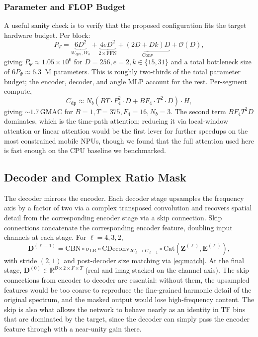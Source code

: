 \documentclass[journal,10pt]{IEEEtran}
\newcommand{\R}{\mathbb{R}}
\newcommand{\bE}{\mathbf{E}}
\newcommand{\bZ}{\mathbf{Z}}
\newcommand{\bD}{\mathbf{D}}
\begin{document}
\subsubsection{Parameter and FLOP Budget}
A useful sanity check is to verify that the proposed configuration fits the target hardware budget. Per block:
\begin{equation}
P_{\Psi}=\underbrace{6D^2}_{W_{\mathrm{qkv}},W_o}+\underbrace{4eD^2}_{2\times\mathrm{FFN}}+\underbrace{(2D+Dk)D}_{\mathrm{Conv}}+\mathcal{O}(D),
\end{equation}
giving \(P_\Psi\!\approx\!1.05\times 10^6\) for \(D=256,e=2,k\in\{15,31\}\) and a total bottleneck size of \(6P_\Psi\!\approx\!6.3\)~M parameters. This is roughly two-thirds of the total parameter budget; the encoder, decoder, and angle MLP account for the rest. Per-segment compute,
\begin{equation}
C_{\mathrm{dp}}\approx N_b\!\left(BT\!\cdot\!F_4^2\!\cdot\!D+BF_4\!\cdot\!T^2\!\cdot\!D\right)\!\cdot\!H,
\end{equation}
giving \(\sim\!1.7\,\mathrm{GMAC}\) for \(B=1,T\!=\!375,F_4\!=\!16,N_b\!=\!3\). The second term \(BF_4 T^2 D\) dominates, which is the time-path attention; reducing it via local-window attention or linear attention would be the first lever for further speedups on the most constrained mobile NPUs, though we found that the full attention used here is fast enough on the CPU baseline we benchmarked.

\subsection{Decoder and Complex Ratio Mask}
The decoder mirrors the encoder. Each decoder stage upsamples the frequency axis by a factor of two via a complex transposed convolution and recovers spatial detail from the corresponding encoder stage via a skip connection. Skip connections concatenate the corresponding encoder feature, doubling input channels at each stage. For \(\ell=4,3,2\),
\begin{equation}
\bD^{(\ell-1)}=\mathrm{CBN}\circ\sigma_{\mathrm{LR}}\circ\mathrm{CDeconv}_{2C_\ell\to C_{\ell-1}}\!\circ\mathrm{Cat}(\bZ^{(\ell)},\bE^{(\ell)}),
\end{equation}
with stride \((2,1)\) and post-decoder size matching via \eqref{eq:match}. At the final stage, \(\bD^{(0)}\in\R^{B\times 2\times F\times T}\) (real and imag stacked on the channel axis). The skip connections from encoder to decoder are essential: without them, the upsampled features would be too coarse to reproduce the fine-grained harmonic detail of the original spectrum, and the masked output would lose high-frequency content. The skip is also what allows the network to behave nearly as an identity in TF bins that are dominated by the target, since the decoder can simply pass the encoder feature through with a near-unity gain there.
\end{document}
